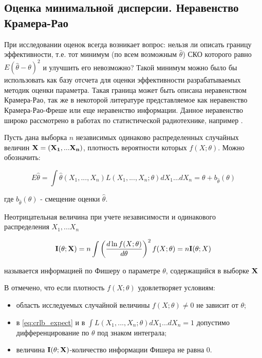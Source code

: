 \subsection{Оценка минимальной дисперсии. Неравенство Крамера-Рао}
\label{s2:crlb}

При исследовании оценок всегда возникает вопрос: нельзя ли описать границу эффективности, т.е. тот минимум (по всем возможным ${\hat \theta}$)
СКО которого равно ${E(\hat \theta -\theta)^2}$ и улучшить его невозможно? Такой минимум можно было бы использовать как базу отсчета для оценки
эффективности разрабатываемых методик оценки параметра. Такая граница может быть описана неравенством Крамера-Рао, так же в некоторой
литературе представляемое как неравенство Крамера-Рао-Фреше или еще неравенство информации. Данное неравенство широко рассмотрено в
работах по статистической радиотехнике, например \cite{aivazyan-book, levin-book, bolshakov-book}.

Пусть дана выборка ${n}$ независимых одинаково распределенных случайных величин ${\bf{X} = (X_1,...X_n)}$, плотность вероятности которых ${f(X; \theta)}$.
Можно обозначить:
\begin{center}
\begin{equation}
	\label{eq:crlb_expect}
	E \hat \theta = \int{\hat \theta} (X_1, ..., X_n)L(X_1,...,X_n;\theta)dX_1...dX_n = \theta + b_{\hat \theta}(\theta)
\end{equation}
\end{center}
где ${b_{\hat \theta}(\theta)}$ - смещение оценки ${\hat \theta}$.

Неотрицательная величина при учете независимости и одинакового распределения ${X_1,...X_n}$
\begin{center}
\begin{equation}
	\label{eq:crlb_fisher}
	{\bf I}(\theta; {\bf X}) = n \int \left( \frac{d \ln f(X;\theta)}{d \theta} \right)^2f(X;\theta)=n {\bf I} (\theta; X)
\end{equation}
\end{center}
называется информацией по Фишеру о параметре ${\theta}$, содержащийся в выборке ${\bf{X}}$

В \cite{aivazyan-book} отмечено, что если плотность ${f(X;\theta)}$ удовлетворяет условиям:
\begin{itemize}
	\item область исследуемых случайной величины ${f(X; \theta)} \ne 0$  не зависит от ${\theta}$;
	\item в \ref{eq:crlb_expect} и в ${\int L(X_1,...,X_n;\theta)dX_1...dX_n}=1$ допустимо дифференцирование по ${\theta}$ под знаком
		интеграла;
	\item величина ${\bf{I}(\theta; X)}$-количество информации Фишера не равна 0.
\end{itemize}

